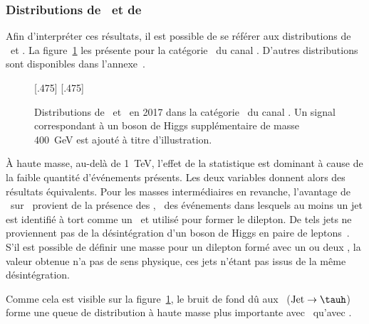 \subsubsection{Distributions de \mml\ et de \mTtot}
Afin d'interpréter ces résultats, il est possible de se référer aux distributions de \mTtot\ et \mml.
La figure~\ref{fig-distributions_mml_mttot_2017_tt_btag} les présente pour la catégorie \CATbtag\ du canal \tauh\tauh.
D'autres distributions sont disponibles dans l'annexe~.
\begin{figure}[h]
\centering

[.475\textwidth]
{}
\hfill
{}[.475\textwidth]
{}

\caption[Distributions de \mTtot\ et \mml\ dans la catégorie \CATbtag\ du canal \tauh\tauh.]{Distributions de \mTtot\ et \mml\ en 2017 dans la catégorie \CATbtag\ du canal \tauh\tauh. Un signal correspondant à un boson de Higgs supplémentaire de masse \SI{400}{\GeV} est ajouté à titre d'illustration.
}
\label{fig-distributions_mml_mttot_2017_tt_btag}
\end{figure}
\par
À haute masse,
au-delà de \SI{1}{\TeV},
l'effet de la statistique est dominant
à cause de la faible quantité d'événements présents.
Les deux variables donnent alors des résultats équivalents.
Pour les masses intermédiaires en revanche,
l'avantage de \mTtot\ sur \mml\ provient de la présence des \ftauhs,
\ie\ des événements dans lesquels au moins un jet est identifié à tort comme un \tauh\ et utilisé pour former le dilepton.
De tels jets ne proviennent pas de la désintégration d'un boson de Higgs en paire de leptons~\tau.
S'il est possible de définir une masse pour un dilepton formé avec un ou deux \ftauh,
la valeur obtenue n'a pas de sens physique, ces jets n'étant pas issus de la même désintégration.
\par
Comme cela est visible sur la figure~\ref{fig-distributions_mml_mttot_2017_tt_btag},
le bruit de fond dû aux \ftauhs\ ($\text{Jet}\to\tauh$) forme une queue de distribution à haute masse plus importante avec \mml\ qu'avec \mTtot.
